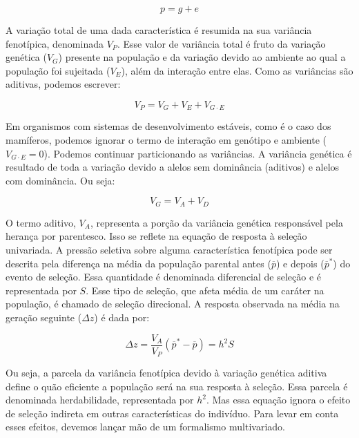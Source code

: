 \begin{equation}
    p = g + e
\end{equation}

A variação total de uma dada característica é resumida na sua variância
fenotípica, denominada $V_P$.
Esse valor de variância total é fruto da variação genética ($V_G$)
presente na população e da variação devido ao ambiente ao qual a população foi
sujeitada ($V_E$), além da interação entre elas. Como as variâncias são
aditivas, podemos escrever:

\begin{equation}
    V_P = V_G + V_E + V_{G \cdot E}
\end{equation}

Em organismos com sistemas de desenvolvimento estáveis, como é o caso
dos mamíferos, podemos ignorar o termo de interação em genótipo e
ambiente ($V_{G \cdot E} = 0$). Podemos continuar particionando as
variâncias. 
A variância genética é resultado de toda a variação devido a alelos sem
dominância (aditivos) e alelos com dominância.
Ou seja:

\begin{equation}
    V_G = V_A + V_D 
\end{equation}

O termo aditivo, $V_A$, representa a porção da variância genética
responsável pela herança por parentesco.
Isso se reflete na equação de resposta à seleção univariada.
A pressão seletiva sobre alguma característica fenotípica pode ser descrita
pela diferença na média da população parental antes ($\overline p$) e depois
($\overline p^*$) do evento de seleção.
Essa quantidade é denominada diferencial de seleção e é representada por
$S$. 
Esse tipo de seleção, que afeta média de um caráter na população, é
chamado de seleção direcional.
A resposta observada na média na geração seguinte ($\Delta z$) é dada
por:

\begin{equation}
    \Delta z = \frac{V_A}{V_P} (\overline p^* - \overline p) = h^2S
\end{equation}

Ou seja, a parcela da variância fenotípica devido à variação genética
aditiva define o quão eficiente a população será na sua resposta à
seleção. Essa parcela é denominada herdabilidade, representada por
$h^2$.
Mas essa equação ignora o efeito de seleção indireta em outras
características do indivíduo. Para levar em conta esses efeitos, devemos
lançar mão de um formalismo multivariado. 

